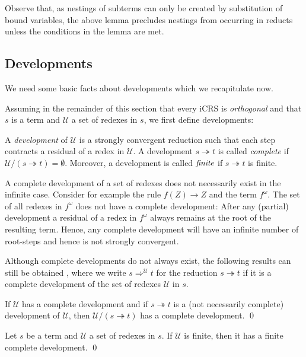 \documentclass{LMCS}
\theoremstyle{plain}
\theoremstyle{definition}
\newcommand{\rew}{\rightarrow}
\newcommand{\trewt}{\twoheadrightarrow}
\newcommand{\dev}{\Rightarrow}
\begin{document}
Observe that, as nestings of subterms can only be created by substitution of bound variables, the above lemma precludes nestings from occurring in reducts unless the conditions in the lemma are met.

\subsection{Developments}
\label{sec:dev}

We need some basic facts about developments which we recapitulate now.

Assuming in the remainder of this section that every iCRS is \emph{orthogonal} and that $s$ is a term and $\mathcal{U}$ a set of redexes in $s$, we first define developments:
\begin{defi}
A \emph{development} of $\mathcal{U}$ is a strongly convergent reduction
such that each step contracts a residual of a redex in $\mathcal{U}$. A
development $s  \trewt t$ is called \emph{complete} if $\mathcal{U}/(s \trewt
t) = \emptyset$. Moreover, a development is called $\emph{finite}$ if
$s \trewt t$ is finite.
\end{defi}

A complete development of a set of redexes does not necessarily exist in the infinite case. Consider for example the rule $f(Z) \rew Z$ and the term $f^\omega$. The set of all redexes in $f^\omega$ does not have a complete development: After any (partial) development a residual of a redex in $f^\omega$ always remains at the root of the resulting term. Hence, any complete development will have an infinite number of root-steps and hence is not strongly convergent.

Although complete developments do not always exist, the following results can still be obtained \cite{JJ05b}, where we write $s \dev^\mathcal{U} t$ for the reduction $s \trewt t$ if it is a complete development of the set of redexes $\mathcal{U}$ in $s$.

\begin{lem}
\label{cdacrossd}
If $\mathcal{U}$ has a complete development and if $s \trewt t$ is a (not necessarily complete) development of $\mathcal{U}$, then $\mathcal{U}/(s \trewt t)$ has a complete development. \qed
\end{lem}

\begin{lem}
Let $s$ be a term and $\mathcal{U}$ a set of redexes in $s$. If $\mathcal{U}$ is finite, then it has a finite complete development. \qed
\end{lem}
\end{document}
